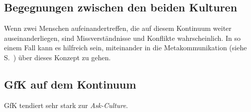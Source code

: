 \subsection{Begegnungen zwischen den beiden Kulturen}

Wenn zwei Menschen aufeinandertreffen, die auf diesem Kontinuum weiter auseinanderliegen, sind Missverständnisse und Konflikte wahrscheinlich. In so einem Fall kann es hilfreich sein, miteinander in die Metakommunikation (siehe S.~\pageref{metakommunikation}) über dieses Konzept zu gehen.


\subsection{GfK auf dem Kontinuum}

GfK tendiert sehr stark zur \emph{Ask-Culture}.
